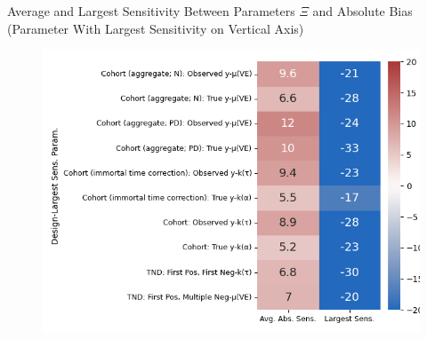 \documentclass[aspectratio=169]{beamer}
\begin{document}
\begin{frame}{Average and Largest Sensitivity Between Parameters $\Xi$ and Absolute Bias (Parameter With Largest Sensitivity on Vertical Axis)}
	\begin{figure}[H]
		\centering
		\includegraphics[scale=0.5]{VEMethod_Drivers1b_FEest_Li_MSpec_Robustness_Heatmap.png}
	\end{figure}
\end{frame}
\end{document}

